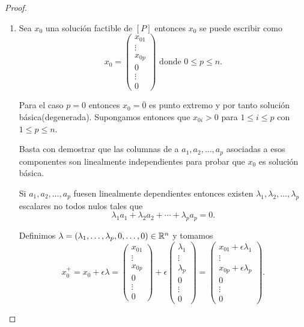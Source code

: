 \begin{proof}
  \begin{enumerate}
    \item Sea $x_0$ una solución factible de $[P]$ entonces $x_0$ se puede escribir como
    $$x_0=\left(
      \begin{array}{c}
        x_{01}\\ \vdots \\x_{0p}\\ 0 \\ \vdots \\ 0
      \end{array}\right) \text{ donde $0\le p\le n$.}$$
    
    Para el caso $p=0$ entonces $x_0=\overline0$ es punto extremo y por tanto solución básica(degenerada). Supongamos entonces que $x_{0i}>0$ para $1\le i\le p$ con $1\le p\le n$.
    
    Basta con demostrar que las columnas de a $a_1,a_2,\dots,a_p$ asociadas a esos componentes son linealmente independientes para probar que $x_0$ es solución básica.
    
    Si $a_1,a_2,\dots,a_p$ fuesen linealmente dependientes entonces existen $\lambda_1,\lambda_2,\dots,\lambda_p$ escalares no todos nulos tales que
    $$\lambda_1 a_1+\lambda_2 a_2+\cdots+\lambda_p a_p=0.$$
    
    Definimos $\lambda=(\lambda_1,\dots,\lambda_p,0,\dots,0)\in\mathbb R^n$ y tomamos
    $$x_0^+=x_0+\epsilon\lambda=\left(
      \begin{array}{c}
        x_{01}\\\vdots\\x_{0p}\\0\\\vdots\\0
      \end{array}\right)
    +\epsilon
    \left(
      \begin{array}{c}
        \lambda_{1}\\\vdots\\\lambda_{p}\\0\\\vdots\\0
      \end{array}\right)
    =
    \left(
      \begin{array}{c}
        x_{01}+\epsilon\lambda_1\\
        \vdots\\
        x_{0p}+\epsilon\lambda_p\\
        0\\\vdots\\0
      \end{array}\right).$$
    

\end{enumerate}
\end{proof}
